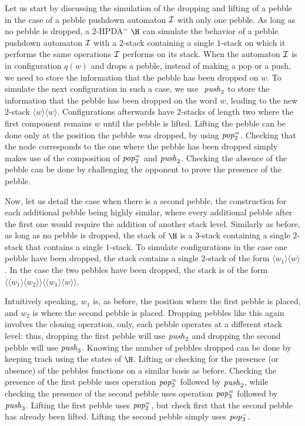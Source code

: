 {Let us start by discussing the simulation of the dropping and lifting of a pebble in the case of
a pebble pushdown automaton $\mathcal{I}$ with only one pebble.
As long as no pebble is dropped, a $2$-HPDA$^=$ $\H$ can simulate 
the behavior of a pebble pushdown automaton $\mathcal{I}$ with a $2$-stack containing a single $1$-stack
on which it performs the same operations $\mathcal{I}$ performs on its stack.
When the automaton $\mathcal{I}$ is in configuration $q(w)$ and drops a pebble, instead of making a pop or a push, we need
to %
	store the information that the pebble has been
dropped on $w$.
To simulate the next configuration in such a case, we use 
$\text{\textit{ push}}_2$
to store the information that the pebble has been dropped on the word $w$, leading to the new  $2$-stack
$\langle w \rangle \langle w \rangle$. 
Configurations afterwards have $2$-stacks of length two where the first component remains
$w$ until the pebble is lifted.
Lifting the pebble can be done only at the position the
pebble was dropped, by using $\text{\textit{pop}}^=_2$.
Checking that the node
corresponds to the one where the pebble has been dropped simply makes use of
the composition of $\text{\textit{pop}}^=_2$ and $\text{\textit{push}}_2$.
Checking the absence of the pebble can be done by challenging
the opponent to prove the presence of the pebble.

Now, let us detail the case when there is a second pebble, the construction
for each additional pebble being highly similar, where every additional pebble after
the first one would require the addition of another stack level.
Similarly as before, 
as long as no pebble is dropped, the stack of $\H$ 
is a $3$-stack containing a
single $2$-stack that contains a single $1$-stack.
To simulate configurations in the case one pebble have been dropped, the stack contains a single
 $2$-stack of the form $\langle w_1 \rangle \langle w \rangle$.
In the case the two pebbles have been dropped, 
the stack is of the form $ \langle \langle w_1 \rangle \langle w_2 \rangle \rangle
\langle \langle w_1 \rangle \langle w \rangle \rangle$. 



Intuitively speaking, $w_1$ is, as before, the position where the first pebble is
placed, and $w_2$ is where the second pebble is placed. Dropping pebbles like this
again involves the cloning operation, only, each pebble operates at a different 
stack level: thus, dropping the first pebble will use $\text{\textit{push}}_2$
and dropping the second pebble will use $\text{\textit{push}}_3$. Knowing the number of pebbles dropped can be done by 
keeping track using the states of $\H$.
Lifting or
checking for the presence 
(or absence) 
of the pebbles functions on a similar
basis as before. Checking the presence of the first pebble uses 
operation $\text{\textit{pop}}^=_2$ followed by $\text{\textit{push}}_2$,
while checking the presence of the second pebble uses 
operation $\text{\textit{pop}}^=_3$ followed by $\text{\textit{push}}_3$.
Lifting the first pebble uses $\text{\textit{pop}}^=_2$, but
check first that the second pebble has already been lifted.
Lifting the second pebble simply uses $\text{\textit{pop}}^=_3$.


}
